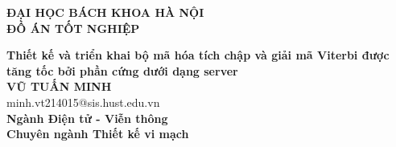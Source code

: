 \documentclass[DoAn.tex]{subfiles}
\begin{document}
\begin{titlepage}
\thispagestyle{empty}
\begin{center}

{\textbf{\large{ĐẠI HỌC BÁCH KHOA HÀ NỘI}}}\\[4cm]

{\textbf{\huge{ ĐỒ ÁN TỐT NGHIỆP}}}\\[1cm]
{\textbf{\Large{Thiết kế và triển khai bộ mã hóa tích chập và giải mã Viterbi được tăng tốc bởi phần cứng dưới dạng server}}\\[1cm]

{\textbf{\large{VŨ TUẤN MINH}}}\\
{\large{minh.vt214015@sis.hust.edu.vn}}\\[0.5cm]

{\textbf{\large{Ngành Điện tử - Viễn thông}}}\\
{\textbf{\large{Chuyên ngành Thiết kế vi mạch}}}\\

\vspace{2cm}
\begin{table}[H]
\centering
{}
\end{table}}
\end{center}



\end{titlepage}
\end{document}
